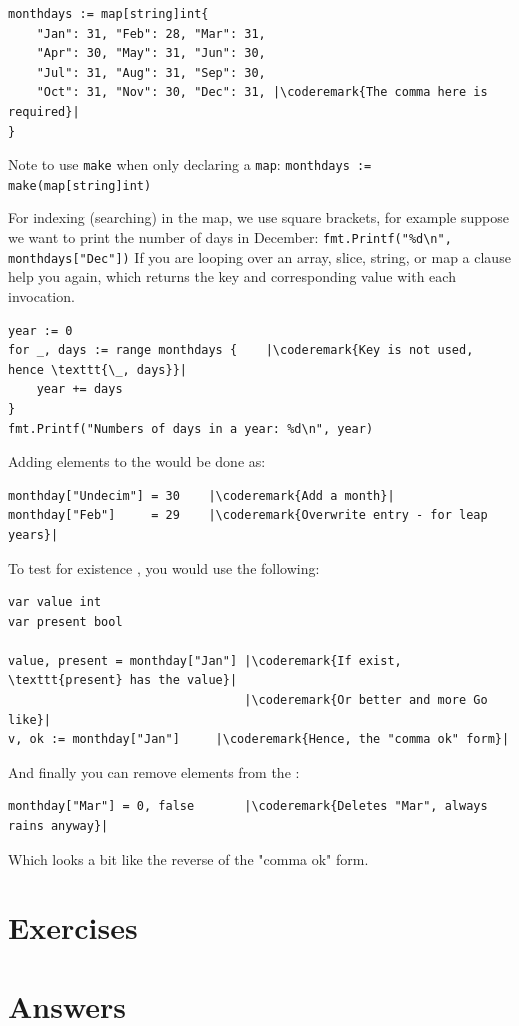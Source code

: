 \begin{lstlisting}
monthdays := map[string]int{
	"Jan": 31, "Feb": 28, "Mar": 31, 
	"Apr": 30, "May": 31, "Jun": 30, 
	"Jul": 31, "Aug": 31, "Sep": 30, 
	"Oct": 31, "Nov": 30, "Dec": 31, |\coderemark{The comma here is required}|
}		    
\end{lstlisting}
Note to use \lstinline{make} when only declaring a \lstinline{map}:
\lstinline|monthdays := make(map[string]int)|

For indexing (searching) in the map, we use square brackets, for example
suppose we want to print the
number of days in December: \lstinline{fmt.Printf("%d\n", monthdays["Dec"])}\newline
If you are looping over an array, slice, string, or map a
clause help you again, which returns the key and corresponding value
with each invocation.
\begin{lstlisting}
year := 0
for _, days := range monthdays {    |\coderemark{Key is not used, hence \texttt{\_, days}}|
    year += days
}
fmt.Printf("Numbers of days in a year: %d\n", year)
\end{lstlisting}
Adding elements to the   would be done as:
\begin{lstlisting}
monthday["Undecim"] = 30	|\coderemark{Add a month}|
monthday["Feb"]     = 29	|\coderemark{Overwrite entry - for leap years}|
\end{lstlisting}
To test for existence , you would use the
following\cite{go_course_day2}:
\begin{lstlisting}
var value int
var present bool

value, present = monthday["Jan"] |\coderemark{If exist, \texttt{present} has the value}|
                                 |\coderemark{Or better and more Go like}|
v, ok := monthday["Jan"]	 |\coderemark{Hence, the "comma ok" form}|
\end{lstlisting}
And finally you can remove elements  from the :
\begin{lstlisting}
monthday["Mar"] = 0, false       |\coderemark{Deletes "Mar", always rains anyway}|
\end{lstlisting}
Which looks a bit like the reverse of the "comma ok" form.

\section{Exercises}







\cleardoublepage
\section{Answers}
\shipoutAnswer
